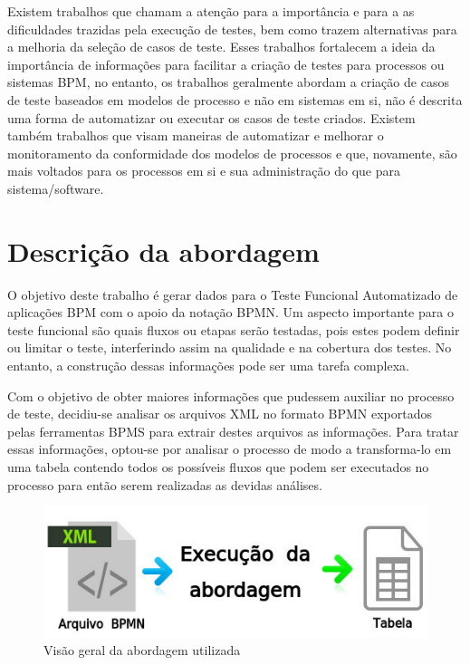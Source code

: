 \documentclass[12pt]{article}
\begin{document}
Existem trabalhos que chamam a atenção para a importância e para a as dificuldades trazidas pela execução de testes, bem como trazem alternativas para a melhoria da seleção de casos de teste\cite{bohmer2015genetic}. Esses trabalhos fortalecem a ideia da importância de informações para facilitar a criação de testes para processos ou sistemas BPM, no entanto, os trabalhos geralmente abordam a criação de casos de teste baseados em modelos de processo e não em sistemas em si, não é descrita uma forma de automatizar ou executar os casos de teste criados. Existem também trabalhos que visam maneiras de automatizar e melhorar o monitoramento da conformidade dos modelos de processos \cite{ly2015compliance,van2012replaying} e que, novamente, são mais voltados para os processos em si e sua administração do que para sistema/software.

\section{Descrição da abordagem}
O objetivo deste trabalho é gerar dados para o Teste Funcional Automatizado de aplicações BPM com o apoio da notação BPMN. Um aspecto importante para o teste funcional são quais fluxos ou etapas serão testadas, pois estes podem definir ou limitar o teste, interferindo assim na qualidade e na cobertura dos testes. No entanto, a construção dessas informações pode ser uma tarefa complexa.

Com o objetivo de obter maiores informações que pudessem auxiliar no processo de teste, decidiu-se analisar os arquivos XML no formato BPMN exportados pelas ferramentas BPMS para extrair destes arquivos as informações. Para tratar essas informações, optou-se por analisar o processo de modo a transforma-lo em uma tabela contendo todos os possíveis fluxos que podem ser executados no processo para então serem realizadas as devidas análises. 

\begin{figure}[ht]
\centering
\includegraphics[width=.8\textwidth]{figuras/abordagem1.png}
\caption{Visão geral da abordagem utilizada}
\label{fig:abordagem1}
\end{figure}
\end{document}
